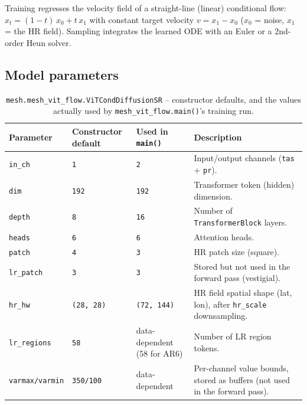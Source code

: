 \documentclass[11pt]{article}
\begin{document}
Training regresses the velocity field of a straight-line (linear)
conditional flow: $x_t = (1-t)\,x_0 + t\,x_1$ with constant target velocity
$v = x_1 - x_0$ ($x_0$ = noise, $x_1$ = the HR field). Sampling integrates
the learned ODE with an Euler or a 2nd-order Heun solver.

\subsection{Model parameters}

\begin{table}[h]
\centering
\caption{\texttt{mesh.mesh\_vit\_flow.ViTCondDiffusionSR} -- constructor defaults, and the
values actually used by \texttt{mesh\_vit\_flow.main()}'s training run.}
\begin{tabular}{@{}lllL{5.5cm}@{}}
\toprule
Parameter & Constructor default & Used in \texttt{main()} & Description \\
\midrule
\texttt{in\_ch}     & \texttt{1}         & \texttt{2}          & Input/output channels (\texttt{tas} + \texttt{pr}). \\
\texttt{dim}        & \texttt{192}       & \texttt{192}        & Transformer token (hidden) dimension. \\
\texttt{depth}      & \texttt{8}         & \texttt{16}         & Number of \texttt{TransformerBlock} layers. \\
\texttt{heads}      & \texttt{6}         & \texttt{6}          & Attention heads. \\
\texttt{patch}      & \texttt{4}         & \texttt{3}          & HR patch size (square). \\
\texttt{lr\_patch}  & \texttt{3}         & \texttt{3}          & Stored but not used in the forward pass (vestigial). \\
\texttt{hr\_hw}     & \texttt{(28, 28)}  & \texttt{(72, 144)}  & HR field spatial shape (lat, lon), after \texttt{hr\_scale} downsampling. \\
\texttt{lr\_regions}& \texttt{58}        & data-dependent (58 for AR6) & Number of LR region tokens. \\
\texttt{varmax/varmin} & \texttt{350/100} & data-dependent  & Per-channel value bounds, stored as buffers (not used in the forward pass). \\
\bottomrule
\end{tabular}
\end{table}
\end{document}
